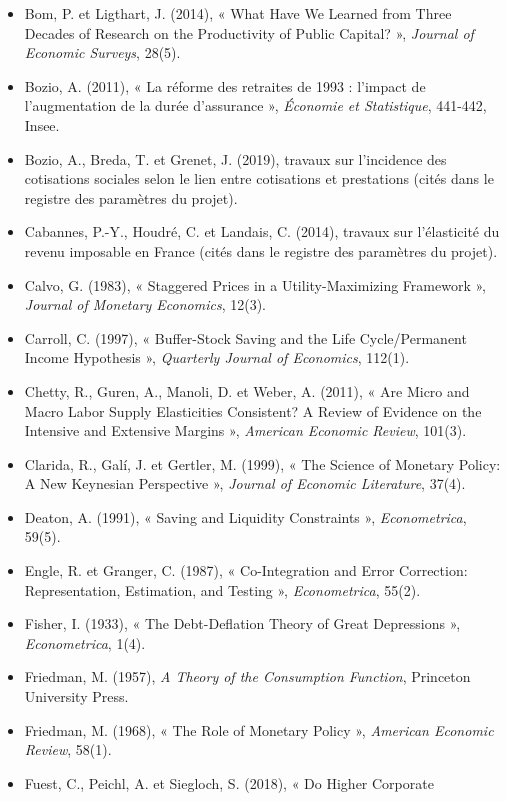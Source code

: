 \documentclass[
  11pt,
  11pt,
  a4paper,
  openany]{book}
\begin{document}
\begin{itemize}
  \emph{Quarterly Journal of Economics}, 113(3).
\item
  Bom, P. et Ligthart, J. (2014), « What Have We Learned from Three
  Decades of Research on the Productivity of Public Capital? »,
  \emph{Journal of Economic Surveys}, 28(5).
\item
  Bozio, A. (2011), « La réforme des retraites de 1993 : l'impact de
  l'augmentation de la durée d'assurance », \emph{Économie et
  Statistique}, 441-442, Insee.
\item
  Bozio, A., Breda, T. et Grenet, J. (2019), travaux sur l'incidence des
  cotisations sociales selon le lien entre cotisations et prestations
  (cités dans le registre des paramètres du projet).
\item
  Cabannes, P.-Y., Houdré, C. et Landais, C. (2014), travaux sur
  l'élasticité du revenu imposable en France (cités dans le registre des
  paramètres du projet).
\item
  Calvo, G. (1983), « Staggered Prices in a Utility-Maximizing Framework
  », \emph{Journal of Monetary Economics}, 12(3).
\item
  Carroll, C. (1997), « Buffer-Stock Saving and the Life Cycle/Permanent
  Income Hypothesis », \emph{Quarterly Journal of Economics}, 112(1).
\item
  Chetty, R., Guren, A., Manoli, D. et Weber, A. (2011), « Are Micro and
  Macro Labor Supply Elasticities Consistent? A Review of Evidence on
  the Intensive and Extensive Margins », \emph{American Economic
  Review}, 101(3).
\item
  Clarida, R., Galí, J. et Gertler, M. (1999), « The Science of Monetary
  Policy: A New Keynesian Perspective », \emph{Journal of Economic
  Literature}, 37(4).
\item
  Deaton, A. (1991), « Saving and Liquidity Constraints »,
  \emph{Econometrica}, 59(5).
\item
  Engle, R. et Granger, C. (1987), « Co-Integration and Error
  Correction: Representation, Estimation, and Testing »,
  \emph{Econometrica}, 55(2).
\item
  Fisher, I. (1933), « The Debt-Deflation Theory of Great Depressions »,
  \emph{Econometrica}, 1(4).
\item
  Friedman, M. (1957), \emph{A Theory of the Consumption Function},
  Princeton University Press.
\item
  Friedman, M. (1968), « The Role of Monetary Policy », \emph{American
  Economic Review}, 58(1).
\item
  Fuest, C., Peichl, A. et Siegloch, S. (2018), « Do Higher Corporate

\end{itemize}
\end{document}
